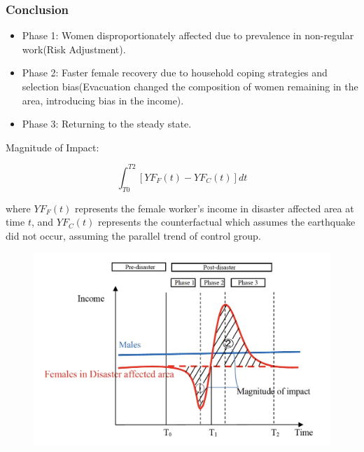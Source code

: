 \documentclass[serif, aspectratio=169]{beamer}
\newcommand{\conclusionlinks}{%
    \vfill %
    \hfill %
    {\small %
        \hyperlink{real_GDP_growth_rate}{\beamerbutton{→ GRP}} \,
        \hyperlink{image}{\beamerbutton{→ Image}} \,
        \hyperlink{LFP}{\beamerbutton{→ LFP}} \,

    }
}
\begin{document}


\begin{frame}[label=conclusion]

\frametitle{Conclusion}

    \begin{minipage}[c]{0.4\linewidth}
        \small

        \vspace{-1.6cm}
        

{\footnotesize
\begin{itemize}
    \item Phase 1: Women disproportionately affected due to prevalence in non-regular work(Risk Adjustment).
    \item Phase 2: Faster female recovery due to household coping strategies and selection bias(Evacuation changed the composition of women remaining in the area, introducing bias in the income).
    \item Phase 3: Returning to the steady state.
\end{itemize}

}

{\tiny
Magnitude of Impact:
}


{\tiny
\begin{equation}
\int_{T0}^{T2} [YF_F(t) - YF_C(t)] dt
\end{equation}
}

{\tiny
where $YF_F(t)$ represents the female worker's income in disaster affected area at time $t$, and $YF_C(t)$ represents the counterfactual which assumes the earthquake did not occur, assuming the parallel trend of control group.
}

        
        \vspace{-2.1cm}
        

    \end{minipage}\hspace{0.5cm}
    \begin{minipage}{0.2\linewidth}
        \medskip
        \begin{figure}[h]
            \centering
            \includegraphics[height=.7\textheight]{Final_conceptual_model.jpeg}
        \end{figure}
    \end{minipage}

\conclusionlinks

\end{frame}
\end{document}
